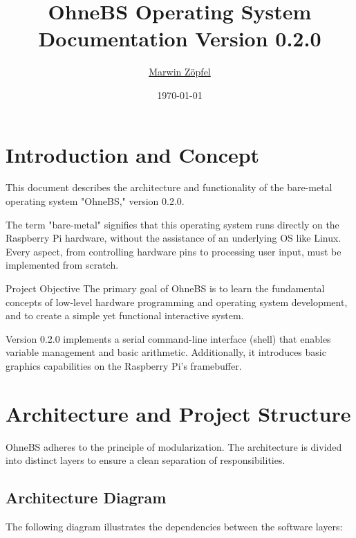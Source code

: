 \documentclass[a4paper, 11pt]{article}
\title{\sffamily\bfseries\Huge OhneBS Operating System\\
	\large \vspace{1em} Documentation Version 0.2.0}
\author{\href{mailto:marwin@zoepfel.de}{Marwin Zöpfel}}
\date{\today}
\begin{document}
	
	\maketitle
	\thispagestyle{empty}
	\newpage
	
	\tableofcontents
	\newpage
	
	\section{Introduction and Concept}
	This document describes the architecture and functionality of the bare-metal operating system "OhneBS," version 0.2.0.
	
	The term "bare-metal" signifies that this operating system runs directly on the Raspberry Pi hardware, without the assistance of an underlying OS like Linux. Every aspect, from controlling hardware pins to processing user input, must be implemented from scratch.
	
	\begin{infobox}{Project Objective}
		The primary goal of OhneBS is to learn the fundamental concepts of low-level hardware programming and operating system development, and to create a simple yet functional interactive system.
	\end{infobox}
	
	Version 0.2.0 implements a serial command-line interface (shell) that enables variable management and basic arithmetic. Additionally, it introduces basic graphics capabilities on the Raspberry Pi's framebuffer.
	
	\section{Architecture and Project Structure}
	OhneBS adheres to the principle of modularization. The architecture is divided into distinct layers to ensure a clean separation of responsibilities.
	
	\subsection{Architecture Diagram}
	The following diagram illustrates the dependencies between the software layers:
	
\end{document}
